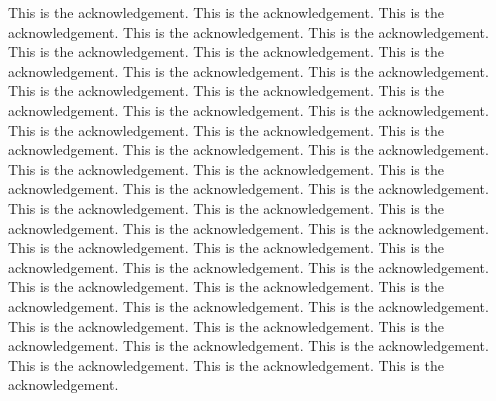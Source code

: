 This is the acknowledgement.
This is the acknowledgement.
This is the acknowledgement.
This is the acknowledgement.
This is the acknowledgement.
This is the acknowledgement.
This is the acknowledgement.
This is the acknowledgement.
This is the acknowledgement.
This is the acknowledgement.
This is the acknowledgement.
This is the acknowledgement.
This is the acknowledgement.
This is the acknowledgement.
This is the acknowledgement.
This is the acknowledgement.
This is the acknowledgement.
This is the acknowledgement.
This is the acknowledgement.
This is the acknowledgement.
This is the acknowledgement.
This is the acknowledgement.
This is the acknowledgement.
This is the acknowledgement.
This is the acknowledgement.
This is the acknowledgement.
This is the acknowledgement.
This is the acknowledgement.
This is the acknowledgement.
This is the acknowledgement.
This is the acknowledgement.
This is the acknowledgement.
This is the acknowledgement.
This is the acknowledgement.
This is the acknowledgement.
This is the acknowledgement.
This is the acknowledgement.
This is the acknowledgement.
This is the acknowledgement.
This is the acknowledgement.
This is the acknowledgement.
This is the acknowledgement.
This is the acknowledgement.
This is the acknowledgement.
This is the acknowledgement.
This is the acknowledgement.
This is the acknowledgement.
This is the acknowledgement.
